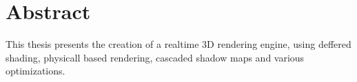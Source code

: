 \section{Abstract}

This thesis presents the creation of a realtime 3D rendering engine, using deffered shading,
physicall based rendering, cascaded shadow maps and various optimizations.
